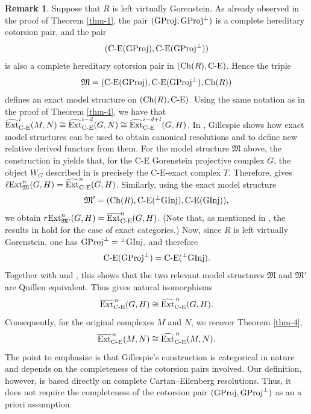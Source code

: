 \documentclass[reqno,12pt]{amsart}
\numberwithin{equation}{section}
\def\Ext{\mbox{\rm Ext}} \def\Tor{\mbox{\rm Tor}}\def\Hom{\mbox{\rm Hom}} \def\dim{\mbox{\rm dim}} \def\Iso{\mbox{\rm Iso}}
\def\dim{\mbox{\rm dim}}\def\Irr{\mbox{\rm Irr}}\def\rad{\mbox{\rm rad}}\def\fg{\mbox{\rm fg}}
\def\Ch{\mbox{\rm Ch}}
\theoremstyle{plain}
\theoremstyle{definition}
\newtheorem{remark}[theorem]{\bf Remark}
\newcommand{\CE}{\mathrm{C}\text{-}\mathrm{E}}
\begin{document}


\begin{remark} \label{rmk-2}
    Suppose that $R$ is left virtually Gorenstein. As already observed in the proof of
    Theorem \ref{thm-1}, the pair $({\rm GProj},{\rm GProj}^{\perp})$ is a complete hereditary
    cotorsion pair, and the pair
    $$(\text{C-E}({\rm GProj}),\text{C-E}({\rm GProj}^{\perp}))$$
    is also a complete hereditary cotorsion pair in $(\Ch(R),\text{C-E})$. Hence the triple
    $$\mathfrak{M}=(\text{C-E}({\rm GProj}),\text{C-E}({\rm GProj}^{\perp}),\Ch(R))$$
    defines an exact model structure on $(\Ch(R),\text{C-E})$. Using the same notation as in the
    proof of Theorem \ref{thm-4}, we have that
    $\widehat{\Ext}^i_{\text{C-E}}(M,N)\cong \widehat{\Ext}^{i-d}_{\text{C-E}}(G,N)\cong \widehat{\Ext}^{i-d+l}_{\text{C-E}}(G,H)$.
    In \cite{G21}, Gillespie shows how exact model structures can be used to obtain canonical resolutions and to define new
    relative derived functors from them. For the model structure $\mathfrak{M} $ above, the construction in \cite[Section 1]{G21} yields that, for the C-E Gorenstein projective complex $G$, the object $W_G$ described in \cite[Section 1]{G21} is precisely the $\CE$-exact complex $T$. Therefore, \cite[Definition 4.6]{G21} gives $\ell\Ext_{\mathfrak{M}}^n(G,H)=\widehat{\Ext}^n_{\text{C-E}}(G,H)$.
    Similarly, using the exact model structure $$\mathfrak{M}'=(\Ch(R),\text{C-E}(^{\perp}{\rm GInj}),\text{C-E}({\rm GInj})), $$ we obtain
    $r\Ext_{\mathfrak{M}'}^n(G,H)=\overline{\Ext}^n_{\text{C-E}}(G,H)$.
    (Note that, as mentioned in \cite[1A.]{G21}, the results in \cite{G21} hold for the case of exact
    categories.)
    \newline Now, since \(R\) is left virtually Gorenstein, one has ${\rm GProj}^{\perp}={}^{\perp}{\rm GInj},$
and therefore
\[
\text{\rm C-E}({\rm GProj}^{\perp})
=
\text{\rm C-E}({}^{\perp}{\rm GInj}).
\]
Together with \cite[Lemma 5.4]{EG19} and \cite[Lemma 8.26]{G25}, this shows that
the two relevant model structures $\mathfrak{M}$ and $\mathfrak{M}'$ are Quillen equivalent. Thus
\cite[Theorem 6.3]{G21} gives natural isomorphisms
\[
\overline{\Ext}^{\,n}_{\text{\rm C-E}}(G,H)
\cong
\widehat{\Ext}^{\,n}_{\text{\rm C-E}}(G,H).
\]
Consequently, for the original complexes \(M\) and \(N\), we recover Theorem \ref{thm-4},
\[
\overline{\Ext}^{\,n}_{\text{\rm C-E}}(M,N)
\cong
\widehat{\Ext}^{\,n}_{\text{\rm C-E}}(M,N).
\]
The point to emphasize is that Gillespie's construction is categorical in
nature and depends on the completeness of the cotorsion pairs involved. Our
definition, however, is based directly on complete Cartan--Eilenberg
resolutions. Thus, it does not require the completeness of the cotorsion pair
\(({\rm GProj},{\rm GProj}^{\perp})\) as an a priori assumption.

\end{remark}
\end{document}
